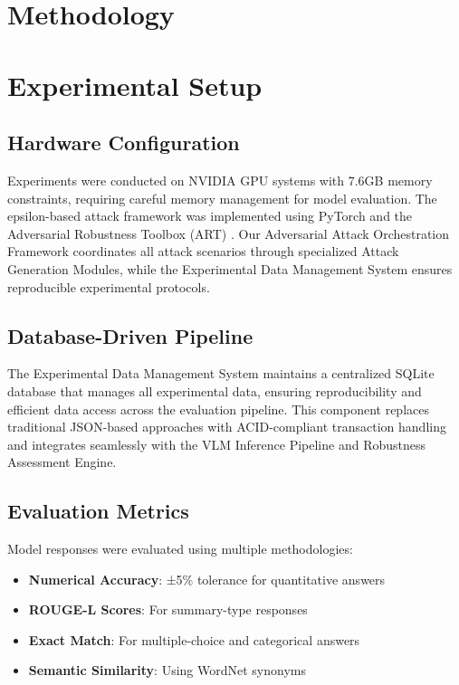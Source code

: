 \documentclass[10pt,twocolumn]{article}
\begin{document}
\section{Methodology}


\section{Experimental Setup}
\label{sec:experimental}

\subsection{Hardware Configuration}
Experiments were conducted on NVIDIA GPU systems with 7.6GB memory constraints, requiring careful memory management for model evaluation. The epsilon-based attack framework was implemented using PyTorch and the Adversarial Robustness Toolbox (ART) \cite{art2018}. Our Adversarial Attack Orchestration Framework coordinates all attack scenarios through specialized Attack Generation Modules, while the Experimental Data Management System ensures reproducible experimental protocols.

\subsection{Database-Driven Pipeline}
The Experimental Data Management System maintains a centralized SQLite database that manages all experimental data, ensuring reproducibility and efficient data access across the evaluation pipeline. This component replaces traditional JSON-based approaches with ACID-compliant transaction handling and integrates seamlessly with the VLM Inference Pipeline and Robustness Assessment Engine.

\subsection{Evaluation Metrics}
Model responses were evaluated using multiple methodologies:
\begin{itemize}
    \item \textbf{Numerical Accuracy}: ±5\% tolerance for quantitative answers
    \item \textbf{ROUGE-L Scores}: For summary-type responses
    \item \textbf{Exact Match}: For multiple-choice and categorical answers
    \item \textbf{Semantic Similarity}: Using WordNet synonyms
\end{itemize}
\end{document}
